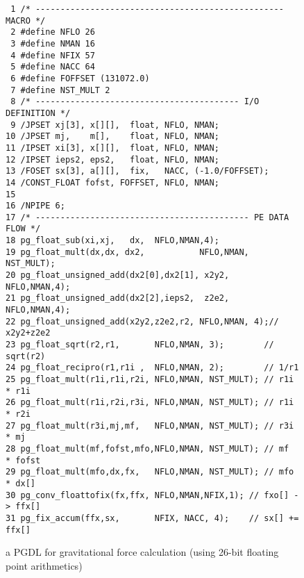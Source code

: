 \documentclass{llncs}
\begin{document}
\begin{figure}
\scriptsize
{\tiny
\begin{verbatim}
 1 /* -------------------------------------------------- MACRO */
 2 #define NFLO 26
 3 #define NMAN 16
 4 #define NFIX 57
 5 #define NACC 64
 6 #define FOFFSET (131072.0)
 7 #define NST_MULT 2
 8 /* ----------------------------------------- I/O DEFINITION */
 9 /JPSET xj[3], x[][],  float, NFLO, NMAN;
10 /JPSET mj,    m[],    float, NFLO, NMAN;
11 /IPSET xi[3], x[][],  float, NFLO, NMAN;
12 /IPSET ieps2, eps2,   float, NFLO, NMAN;
13 /FOSET sx[3], a[][],  fix,   NACC, (-1.0/FOFFSET);
14 /CONST_FLOAT fofst, FOFFSET, NFLO, NMAN;
15
16 /NPIPE 6;
17 /* ------------------------------------------- PE DATA FLOW */
18 pg_float_sub(xi,xj,   dx,  NFLO,NMAN,4);
19 pg_float_mult(dx,dx, dx2,           NFLO,NMAN, NST_MULT);
20 pg_float_unsigned_add(dx2[0],dx2[1], x2y2,  NFLO,NMAN,4);
21 pg_float_unsigned_add(dx2[2],ieps2,  z2e2,  NFLO,NMAN,4);
22 pg_float_unsigned_add(x2y2,z2e2,r2, NFLO,NMAN, 4);// x2y2+z2e2
23 pg_float_sqrt(r2,r1,       NFLO,NMAN, 3);        // sqrt(r2)
24 pg_float_recipro(r1,r1i ,  NFLO,NMAN, 2);        // 1/r1
25 pg_float_mult(r1i,r1i,r2i, NFLO,NMAN, NST_MULT); // r1i * r1i
26 pg_float_mult(r1i,r2i,r3i, NFLO,NMAN, NST_MULT); // r1i * r2i
27 pg_float_mult(r3i,mj,mf,   NFLO,NMAN, NST_MULT); // r3i * mj
28 pg_float_mult(mf,fofst,mfo,NFLO,NMAN, NST_MULT); // mf  * fofst
29 pg_float_mult(mfo,dx,fx,   NFLO,NMAN, NST_MULT); // mfo * dx[]
30 pg_conv_floattofix(fx,ffx, NFLO,NMAN,NFIX,1); // fxo[] -> ffx[]
31 pg_fix_accum(ffx,sx,       NFIX, NACC, 4);    // sx[] += ffx[]
\end{verbatim}
}
\caption{a PGDL for gravitational force calculation (using 26-bit floating point arithmetics)}
\label{figgravfloat_pgdl}
\end{figure}
\end{document}
